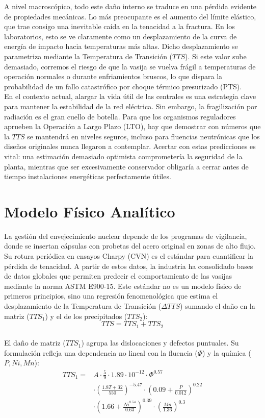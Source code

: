 \documentclass[a4paper, 12pt, twocolumn]{book}
\begin{document}
A nivel macroscópico, todo este daño interno se traduce en una pérdida evidente de propiedades mecánicas. Lo más preocupante es el aumento del límite elástico, que trae consigo una inevitable caída en la tenacidad a la fractura. En los laboratorios, esto se ve claramente como un desplazamiento de la curva de energía de impacto hacia temperaturas más altas. Dicho desplazamiento se parametriza mediante la Temperatura de Transición ($TTS$). Si este valor sube demasiado, corremos el riesgo de que la vasija se vuelva frágil a temperaturas de operación normales o durante enfriamientos bruscos, lo que dispara la probabilidad de un fallo catastrófico por choque térmico presurizado (PTS).\\

En el contexto actual, alargar la vida útil de las centrales es una estrategia clave para mantener la estabilidad de la red eléctrica. Sin embargo, la fragilización por radiación es el gran cuello de botella. Para que los organismos reguladores aprueben la Operación a Largo Plazo (LTO), hay que demostrar con números que la $TTS$ se mantendrá en niveles seguros, incluso para fluencias neutrónicas que los diseños originales nunca llegaron a contemplar. Acertar con estas predicciones es vital: una estimación demasiado optimista comprometería la seguridad de la planta, mientras que ser excesivamente conservador obligaría a cerrar antes de tiempo instalaciones energéticas perfectamente útiles.

\section{Modelo Físico Analítico}

La gestión del envejecimiento nuclear depende de los programas de vigilancia, donde se insertan cápsulas con probetas del acero original en zonas de alto flujo. Su rotura periódica en ensayos Charpy (CVN) es el estándar para cuantificar la pérdida de tenacidad. A partir de estos datos, la industria ha consolidado bases de datos globales que permiten predecir el comportamiento de las vasijas mediante la norma ASTM E900-15. Este estándar no es un modelo físico de primeros principios, sino una regresión fenomenológica que estima el desplazamiento de la Temperatura de Transición ($\Delta TTS$) sumando el daño en la matriz ($TTS_1$) y el de los precipitados ($TTS_2$):\\
$$ TTS = TTS_1 + TTS_2 $$\\

El daño de matriz ($TTS_1$) agrupa las dislocaciones y defectos puntuales. Su formulación refleja una dependencia no lineal con la fluencia ($\Phi$) y la química ($P, Ni, Mn$):\\
{\small\begin{align*}
TTS_1 = & A \cdot \frac{5}{9} \cdot 1.89 \cdot 10^{-12} \cdot \Phi^{0.57} \\
& \cdot \left( \frac{1.8T+32}{550} \right)^{-5.47} \cdot \left( 0.09 + \frac{P}{0.012} \right)^{0.22} \\
& \cdot \left( 1.66 + \frac{Ni^{8.54}}{0.63} \right)^{0.39} \cdot \left( \frac{Mn}{1.36} \right)^{0.3}
\end{align*}}\\
\end{document}
